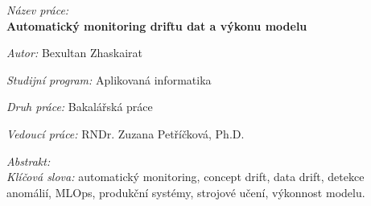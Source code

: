 \CZ
\begin{onehalfspace}
\noindent\emph{Název práce:}\\
\textbf{Automatický monitoring driftu dat a výkonu modelu}

\bigskip
\noindent\emph{Autor:} Bexultan Zhaskairat

\bigskip
\noindent\emph{Studijní program:} Aplikovaná informatika

\bigskip
\noindent\emph{Druh práce:} Bakalářská práce

\bigskip
\noindent\emph{Vedoucí práce:} RNDr. Zuzana Petříčková, Ph.D.

\bigskip
\noindent\emph{Abstrakt:}\\

\bigskip
\noindent\emph{Klíčová slova:}
automatický monitoring, concept drift, data drift, detekce anomálií, MLOps, produkční systémy, strojové učení, výkonnost modelu.
\end{onehalfspace}
\EN
